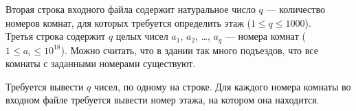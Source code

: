 \begin{problem}
Вторая строка входного файла содержит натуральное число $q$ — количество номеров комнат, для которых требуется определить этаж ($1 \le q \le 1000$).\\

Третья строка содержит $q$ целых чисел $a_1$, $a_2$, \dots, $a_q$ — номера комнат ($1 \le a_i \le 10^{18}$). Можно считать, что в здании так много подъездов, что все комнаты с заданными номерами
существуют.

\OutputFile

Требуется вывести $q$ чисел, по одному на строке. Для каждого номера комнаты во входном файле требуется вывести номер этажа, на котором она находится.

\Examples

\begin{example}
%
\end{example}
\end{problem}
